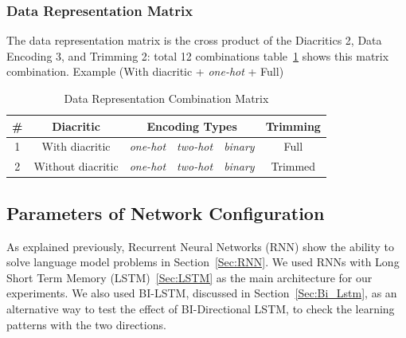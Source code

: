 \subsubsection{Data Representation Matrix}

The data representation matrix is the cross product of the Diacritics 2, Data Encoding 3, and Trimming 2: total 12 combinations table~\ref{Tab:Data_Representation_Matrix} shows this matrix combination. Example (With diacritic + \textit{one-hot} + Full)


\begin{table}[t]
 \centering
 \begin{tabular}{c c c c c c}
 \hline
 \textbf{\#} & \textbf{Diacritic} & \multicolumn{3}{c}{\textbf{Encoding Types}} & \textbf{Trimming} \\
 
 \hline
 1 & With diacritic & \textit{one-hot} & \textit{two-hot} & \textit{binary} & Full \\
 \hline
 2 & Without diacritic & \textit{one-hot} & \textit{two-hot} & \textit{binary} & Trimmed \\
 \hline
 \end{tabular}
 \caption{Data Representation Combination Matrix}\label{Tab:Data_Representation_Matrix}
\end{table}


%  
\subsection{Parameters of Network Configuration}\label{Sec:Rnn_Param}

As explained previously, Recurrent Neural Networks (RNN) show the ability to solve language model problems in Section~\ref{Sec:RNN}. We used RNNs with Long Short Term Memory (LSTM)~\ref{Sec:LSTM} as the main architecture for our experiments. We also used BI-LSTM, discussed in Section~\ref{Sec:Bi_Lstm}, as an alternative way to test the effect of BI-Directional LSTM, to check the learning patterns with the two directions.

